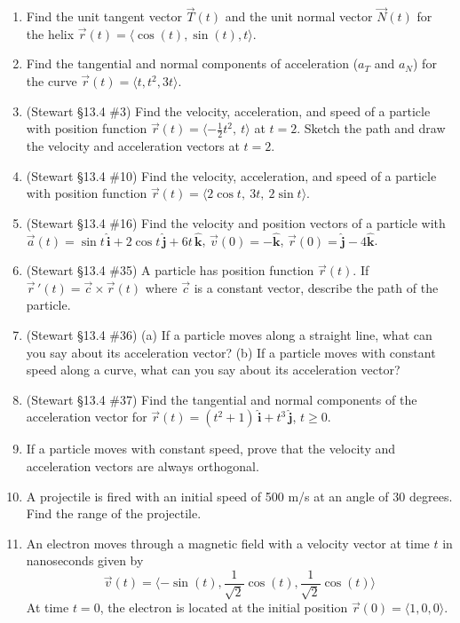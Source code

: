 \documentclass[12pt]{article}
\newcommand{\ihat}{\hat{\textbf{i}}}
\newcommand{\jhat}{\hat{\textbf{j}}}
\newcommand{\khat}{\hat{\textbf{k}}}
\begin{document}
\begin{enumerate}
\begin{enumerate}
        \item Find the unit tangent vector $\vec{T}(t)$ and the unit normal vector $\vec{N}(t)$ for the helix $\vec{r}(t) = \langle \cos(t), \sin(t), t \rangle$.
        \item Find the tangential and normal components of acceleration ($a_T$ and $a_N$) for the curve $\vec{r}(t) = \langle t, t^2, 3t \rangle$.
        \item (Stewart \S13.4 \#3) Find the velocity, acceleration, and speed of a particle with position function $\vec r(t) = \langle -\tfrac12 t^2,\ t\rangle$ at $t = 2$. Sketch the path and draw the velocity and acceleration vectors at $t=2$.
        \item (Stewart \S13.4 \#10) Find the velocity, acceleration, and speed of a particle with position function $\vec r(t) = \langle 2\cos t,\ 3t,\ 2\sin t\rangle$.
        \item (Stewart \S13.4 \#16) Find the velocity and position vectors of a particle with $\vec a(t) = \sin t\,\ihat + 2\cos t\,\jhat + 6t\,\khat$, $\vec v(0) = -\khat$, $\vec r(0) = \jhat - 4\khat$.
        \item (Stewart \S13.4 \#35) A particle has position function $\vec r(t)$. If $\vec r\,'(t) = \vec c \times \vec r(t)$ where $\vec c$ is a constant vector, describe the path of the particle.
        \item (Stewart \S13.4 \#36) (a) If a particle moves along a straight line, what can you say about its acceleration vector? (b) If a particle moves with constant speed along a curve, what can you say about its acceleration vector?
        \item (Stewart \S13.4 \#37) Find the tangential and normal components of the acceleration vector for $\vec r(t) = (t^2+1)\,\ihat + t^3\,\jhat$, $t\geq 0$.
        \item If a particle moves with constant speed, prove that the velocity and acceleration vectors are always orthogonal.
        \item A projectile is fired with an initial speed of 500 m/s at an angle of 30 degrees.  Find the range of the projectile.
         \item An electron moves through a magnetic field with a velocity vector at time $t$ in nanoseconds given by
        \[ \vec{v}(t) = \langle -\sin(t), \frac{1}{\sqrt{2}}\cos(t), \frac{1}{\sqrt{2}}\cos(t) \rangle \]
        At time $t=0$, the electron is located at the initial position $\vec{r}(0) = \langle 1, 0, 0 \rangle$.
        \begin{enumerate}

\end{enumerate}
\end{enumerate}
\end{enumerate}
\end{document}

